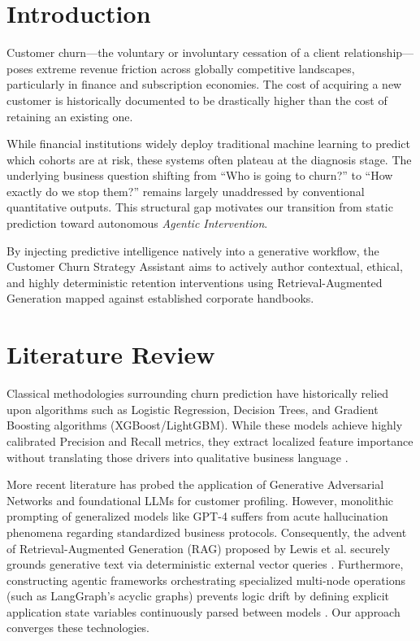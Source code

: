 \documentclass[conference, a4paper]{IEEEtran}
\begin{document}
\section{Introduction}
Customer churn—the voluntary or involuntary cessation of a client relationship—poses extreme revenue friction across globally competitive landscapes, particularly in finance and subscription economies. The cost of acquiring a new customer is historically documented to be drastically higher than the cost of retaining an existing one. 

While financial institutions widely deploy traditional machine learning to predict which cohorts are at risk, these systems often plateau at the diagnosis stage. The underlying business question shifting from “Who is going to churn?” to “How exactly do we stop them?” remains largely unaddressed by conventional quantitative outputs. This structural gap motivates our transition from static prediction toward autonomous \textit{Agentic Intervention}. 

By injecting predictive intelligence natively into a generative workflow, the Customer Churn Strategy Assistant aims to actively author contextual, ethical, and highly deterministic retention interventions using Retrieval-Augmented Generation mapped against established corporate handbooks. 

\section{Literature Review}
Classical methodologies surrounding churn prediction have historically relied upon algorithms such as Logistic Regression, Decision Trees, and Gradient Boosting algorithms (XGBoost/LightGBM). While these models achieve highly calibrated Precision and Recall metrics, they extract localized feature importance without translating those drivers into qualitative business language \cite{mlchurn_classic}. 

More recent literature has probed the application of Generative Adversarial Networks and foundational LLMs for customer profiling. However, monolithic prompting of generalized models like GPT-4 suffers from acute hallucination phenomena regarding standardized business protocols. Consequently, the advent of Retrieval-Augmented Generation (RAG) proposed by Lewis et al. securely grounds generative text via deterministic external vector queries \cite{rag_concept}. Furthermore, constructing agentic frameworks orchestrating specialized multi-node operations (such as LangGraph's acyclic graphs) prevents logic drift by defining explicit application state variables continuously parsed between models \cite{langgraph_docs}. Our approach converges these technologies.
\end{document}
